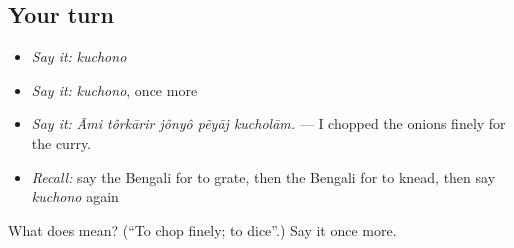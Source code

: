 \subsection*{Your turn}
\begin{itemize}
\raggedright
  \item \emph{Say it:} \emph{kuchono}
  \item \emph{Say it:} \emph{kuchono}, once more
  \item \emph{Say it:} \emph{Āmi tôrkārir jônyô pẽyāj kucholām.} — I chopped the onions finely for the curry.
  \item \emph{Recall:} say the Bengali for to grate, then the Bengali for to knead, then say \emph{kuchono} again
\end{itemize}

\begin{tcolorbox}[breakable,colback=teal!4,colframe=teal!35!black,title={Before you move on}]
What does  mean? (\textquotedblleft{}To chop finely; to dice\textquotedblright{}.) Say it once more.
\end{tcolorbox}
